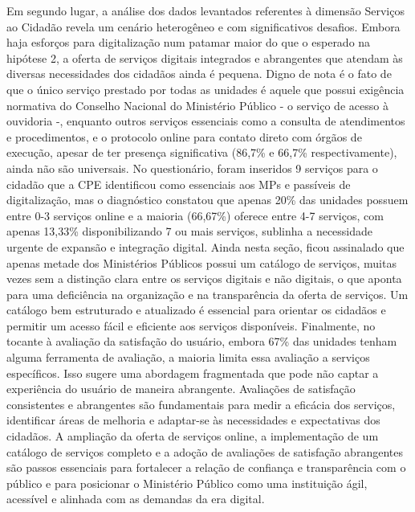 Em segundo lugar, a análise dos dados levantados referentes à dimensão Serviços ao Cidadão revela um cenário heterogêneo e com significativos desafios. Embora haja esforços para digitalização num patamar maior do que o esperado na hipótese 2, a oferta de serviços digitais integrados e abrangentes que atendam às diversas necessidades dos cidadãos ainda é pequena. Digno de nota é o fato de que o único serviço prestado por todas as unidades é aquele que possui exigência normativa do Conselho Nacional do Ministério Público - o serviço de acesso à ouvidoria -, enquanto outros serviços essenciais como a consulta de atendimentos e procedimentos, e o protocolo online para contato direto com órgãos de execução, apesar de ter presença significativa (86,7\% e 66,7\% respectivamente), ainda não são universais. No questionário, foram inseridos 9 serviços para o cidadão que a CPE identificou como essenciais aos MPs e passíveis de digitalização, mas o diagnóstico constatou que apenas 20\% das unidades possuem entre 0-3 serviços online e a maioria (66,67\%) oferece entre 4-7 serviços, com apenas 13,33\% disponibilizando 7 ou mais serviços, sublinha a necessidade urgente de expansão e integração digital. Ainda nesta seção, ficou assinalado que apenas metade dos Ministérios Públicos possui um catálogo de serviços, muitas vezes sem a distinção clara entre os serviços digitais e não digitais, o que aponta para uma deficiência na organização e na transparência da oferta de serviços. Um catálogo bem estruturado e atualizado é essencial para orientar os cidadãos e permitir um acesso fácil e eficiente aos serviços disponíveis. Finalmente, no tocante à avaliação da satisfação do usuário, embora 67\% das unidades tenham alguma ferramenta de avaliação, a maioria limita essa avaliação a serviços específicos. Isso sugere uma abordagem fragmentada que pode não captar a experiência do usuário de maneira abrangente. Avaliações de satisfação consistentes e abrangentes são fundamentais para medir a eficácia dos serviços, identificar áreas de melhoria e adaptar-se às necessidades e expectativas dos cidadãos. A ampliação da oferta de serviços online, a implementação de um catálogo de serviços completo e a adoção de avaliações de satisfação abrangentes são passos essenciais para fortalecer a relação de confiança e transparência com o público e para posicionar o Ministério Público como uma instituição ágil, acessível e alinhada com as demandas da era digital.

